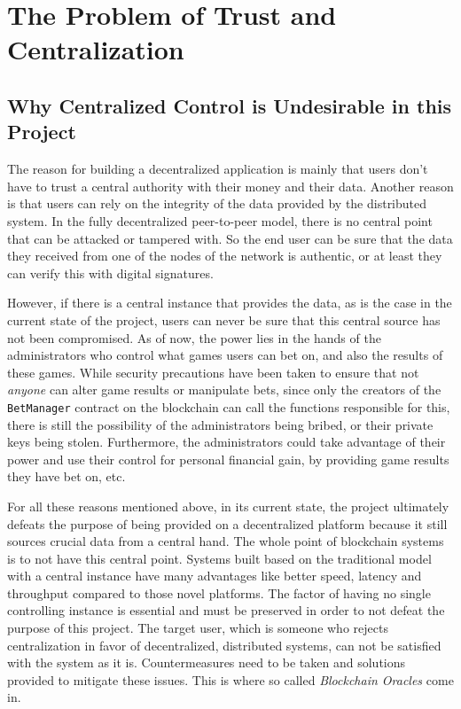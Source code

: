  \chapter{The Problem of Trust and Centralization}
 \label{cha:trust_and_centralization}
 \section{Why Centralized Control is Undesirable in this Project}
 The reason for building a decentralized application is mainly that users don't have to trust a central authority with their money and their data. Another reason is that users can rely on the integrity of the data provided by the distributed system. In the fully decentralized peer-to-peer model, there is no central point that can be attacked or tampered with. So the end user can be sure that the data they received from one of the nodes of the network is authentic, or at least they can verify this with digital signatures.
 
 However, if there is a central instance that provides the data, as is the case in the current state of the project, users can never be sure that this central source has not been compromised. As of now, the power lies in the hands of the administrators who control what games users can bet on, and also the results of these games. While security precautions have been taken to ensure that not \emph{anyone} can alter game results or manipulate bets, since only the creators of the \texttt{BetManager} contract on the blockchain can call the functions responsible for this, there is still the possibility of the administrators being bribed, or their private keys being stolen. Furthermore, the administrators could take advantage of their power and use their control for personal financial gain, by providing game results they have bet on, etc.
 
 For all these reasons mentioned above, in its current state, the project ultimately defeats the purpose of being provided on a decentralized platform because it still sources crucial data from a central hand. The whole point of blockchain systems is to not have this central point. Systems built based on the traditional model with a central instance have many advantages like better speed, latency and throughput compared to those novel platforms. The factor of having no single controlling instance is essential and must be preserved in order to not defeat the purpose of this project. The target user, which is someone who rejects centralization in favor of decentralized, distributed systems, can not be satisfied with the system as it is. Countermeasures need to be taken and solutions provided to mitigate these issues. This is where so called \emph{Blockchain Oracles} come in.
